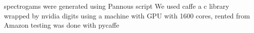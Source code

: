 spectrogams were generated using Pannous script
We used caffe a c library
wrapped by nvidia digits
using a machine with GPU with 1600 cores, rented from Amazon
testing was done with pycaffe